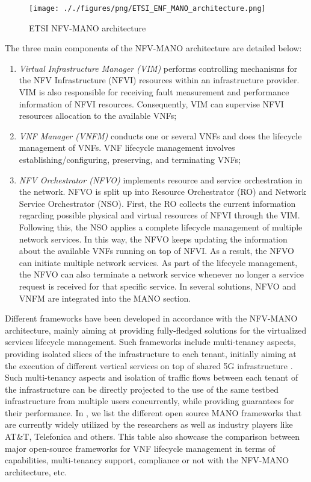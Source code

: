 \begin{figure}[!t]
    \centering
    \texttt{[image: ././figures/png/ETSI\_ENF\_MANO\_architecture.png]}
	\caption{ETSI NFV-MANO architecture}
	\label{fig:ETSI ENF-MANO architecture}
\end{figure}

The three main components of the NFV-MANO architecture are detailed below:
\begin{enumerate}
    \item \textit{Virtual Infrastructure Manager (VIM)} performs controlling mechanisms for the NFV Infrastructure (NFVI) resources within an infrastructure provider. VIM is also responsible for receiving fault measurement and performance information of NFVI resources. Consequently, VIM can supervise NFVI resources allocation to the available VNFs;
    \item \textit{VNF Manager (VNFM)} conducts one or several VNFs and does the lifecycle management of VNFs. VNF lifecycle management involves establishing/configuring, preserving, and terminating VNFs;
    \item \textit{NFV Orchestrator (NFVO)} implements resource and service orchestration in the network. NFVO is split up into Resource Orchestrator (RO) and Network Service Orchestrator (NSO). First, the RO collects the current information regarding possible physical and virtual resources of NFVI through the VIM. Following this, the NSO applies a complete lifecycle management of multiple network services. In this way, the NFVO keeps updating the information about the available VNFs running on top of NFVI. As a result, the NFVO can initiate multiple network services. As part of the lifecycle management, the NFVO can also terminate a network service whenever no longer a service request is received for that specific service. In several solutions, NFVO and VNFM are integrated into the MANO section.
\end{enumerate}


Different frameworks have been developed in accordance with the NFV-MANO architecture, mainly aiming at providing fully-fledged solutions for the virtualized services lifecycle management. Such frameworks include multi-tenancy aspects, providing isolated slices of the infrastructure to each tenant, initially aiming at the execution of different vertical services on top of shared 5G infrastructure \cite{multi-tenant}. Such multi-tenancy aspects and isolation of traffic flows between each tenant of the infrastructure can be directly projected to the use of the same testbed infrastructure from multiple users concurrently, while providing guarantees for their performance. In  , we list the different open source MANO frameworks that are currently widely utilized by the researchers as well as industry players like AT\&T, Telefonica and others. This table also  showcase the comparison between major open-source frameworks for VNF lifecycle management in terms of capabilities, multi-tenancy support, compliance or not with the NFV-MANO architecture, etc.


